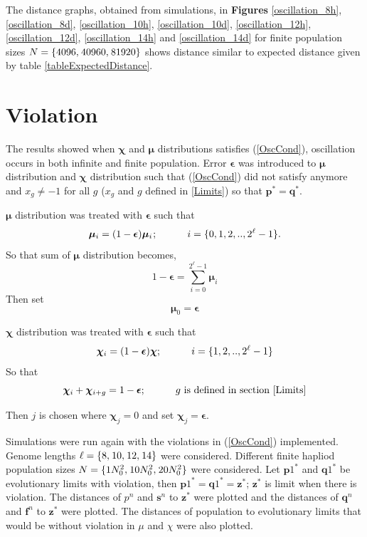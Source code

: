 The distance graphs, obtained from simulations, in \textbf{ Figures} \ref{oscillation_8h}, \ref{oscillation_8d}, \ref{oscillation_10h}, 
\ref{oscillation_10d}, \ref{oscillation_12h}, \ref{oscillation_12d}, \ref{oscillation_14h} and \ref{oscillation_14d}  for 
finite population sizes $N = \{4096, \hspace{0.01in} 40960, \hspace{0.01in} 81920\}$ shows distance similar to expected distance given by table \ref{tableExpectedDistance}.





\newpage

\section{Violation}

The results showed when $\bm{\chi}$ and $\bm{\mu}$ distributions satisfies (\ref{OscCond}), oscillation occurs in both infinite and finite population. 
Error $\bm{\epsilon}$ was introduced to $\bm{\mu}$ distribution and $\bm{\chi}$ distribution such that (\ref{OscCond}) did not satisfy anymore and 
$x_g \neq −1$ for all $g$ ($x_g$ and $g$ defined in \ref{Limits}) so that $\bm{p}^\ast = \bm{q}^\ast$.

$\bm{\mu}$ distribution was treated with $\bm{\epsilon}$ such that
\[
\bm{\mu}_i = (1-\bm{\epsilon}) \bm{\mu}_i \hspace{0.01in}; \hspace{30pt} i = \{0, 1, 2,.., 2^{\ell}-1\}.
\]
So that sum of $\bm{\mu}$ distribution becomes, 
\[
1-\bm{\epsilon} = \sum \limits_{i=0}^{2^{\ell}-1} \bm{\mu}_i
\]
Then set
\[
\bm{\mu}_0 = \bm{\epsilon}
\]

$\bm{\chi}$ distribution was treated with $\bm{\epsilon}$ such that
\[
\bm{\chi}_i = (1-\bm{\epsilon}) \bm{\chi} ; \hspace{30pt} i = \{1, 2,.., 2^{\ell}-1\} 
\]
So that 
\[
\bm{\chi}_i + \bm{\chi}_{i+g} = 1-\bm{\epsilon} ; \hspace{30pt} g \text{ is defined in  section } \ref{Limits}
\]

Then $j$ is chosen where $\bm{\chi}_j = 0$ and set $\bm{\chi}_j = \bm{\epsilon}$. \newline

Simulations were run again with the violations in (\ref{OscCond}) implemented. Genome lengths  $\ell = \{8, \hspace{0.01in} 10, \hspace{0.01in} 12, \hspace{0.01in} 14\}$ were considered. 
Different finite hapliod population sizes $N = \{1N_0^2, \hspace{0.01in} 10N_0^2, \hspace{0.01in} 20N_0^2\}$ were considered. 
\newline
Let ${\bm{p}1}^{\ast}$ and ${\bm{q}1}^{\ast}$ be evolutionary limits with violation, 
then ${\bm{p}1}^{\ast} = {\bm{q}1}^{\ast} = {\bm{z}}^\ast$; $\bm{z}^\ast$ is limit when there is violation.
The distances of ${p}^n$ and $\bm{s}^n$ to $\bm{z}^\ast$ were plotted and the distances of 
$\bm{q}^n$ and $\bm{f}^n$ to $\bm{z}^\ast$ were plotted. The distances of population to evolutionary limits that would be 
without violation in $\mu$ and $\chi$ were also plotted.


